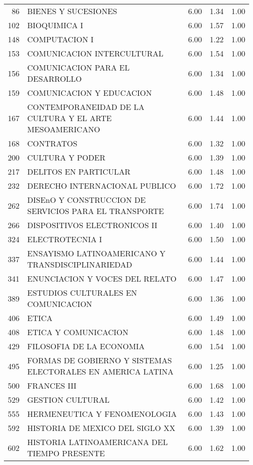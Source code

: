 \documentclass[12pt]{article}
\begin{document}
\begin{table}[ht]
\begin{tabular}{rlrrr}
  86 & BIENES Y SUCESIONES & 6.00 & 1.34 & 1.00 \\ 
  102 & BIOQUIMICA I & 6.00 & 1.57 & 1.00 \\ 
  148 & COMPUTACION I & 6.00 & 1.22 & 1.00 \\ 
  153 & COMUNICACION INTERCULTURAL & 6.00 & 1.54 & 1.00 \\ 
  156 & COMUNICACION PARA EL DESARROLLO & 6.00 & 1.34 & 1.00 \\ 
  159 & COMUNICACION Y EDUCACION & 6.00 & 1.48 & 1.00 \\ 
  167 & CONTEMPORANEIDAD DE LA CULTURA Y EL ARTE MESOAMERICANO & 6.00 & 1.44 & 1.00 \\ 
  168 & CONTRATOS & 6.00 & 1.32 & 1.00 \\ 
  200 & CULTURA Y PODER & 6.00 & 1.39 & 1.00 \\ 
  217 & DELITOS EN PARTICULAR & 6.00 & 1.48 & 1.00 \\ 
  232 & DERECHO INTERNACIONAL PUBLICO & 6.00 & 1.72 & 1.00 \\ 
  262 & DISEnO Y CONSTRUCCION DE SERVICIOS PARA EL TRANSPORTE & 6.00 & 1.74 & 1.00 \\ 
  266 & DISPOSITIVOS ELECTRONICOS II & 6.00 & 1.40 & 1.00 \\ 
  324 & ELECTROTECNIA I & 6.00 & 1.50 & 1.00 \\ 
  337 & ENSAYISMO LATINOAMERICANO Y TRANSDISCIPLINARIEDAD & 6.00 & 1.44 & 1.00 \\ 
  341 & ENUNCIACION Y VOCES DEL RELATO & 6.00 & 1.47 & 1.00 \\ 
  389 & ESTUDIOS CULTURALES EN COMUNICACION & 6.00 & 1.36 & 1.00 \\ 
  406 & ETICA & 6.00 & 1.49 & 1.00 \\ 
  408 & ETICA Y COMUNICACION & 6.00 & 1.48 & 1.00 \\ 
  429 & FILOSOFIA DE LA ECONOMIA & 6.00 & 1.54 & 1.00 \\ 
  495 & FORMAS DE GOBIERNO Y SISTEMAS ELECTORALES EN AMERICA LATINA & 6.00 & 1.25 & 1.00 \\ 
  500 & FRANCES III & 6.00 & 1.68 & 1.00 \\ 
  529 & GESTION CULTURAL & 6.00 & 1.42 & 1.00 \\ 
  555 & HERMENEUTICA Y FENOMENOLOGIA & 6.00 & 1.43 & 1.00 \\ 
  592 & HISTORIA DE MEXICO DEL SIGLO XX & 6.00 & 1.39 & 1.00 \\ 
  602 & HISTORIA LATINOAMERICANA DEL TIEMPO PRESENTE & 6.00 & 1.62 & 1.00 \\ 

\end{tabular}
\end{table}
\end{document}
